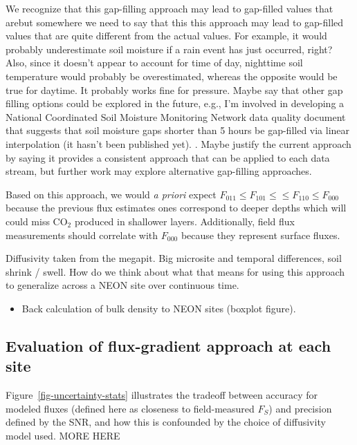 \documentclass[
  letterpaper,
  DIV=11,
  numbers=noendperiod]{scrartcl}
\providecommand{\tightlist}{%
  \setlength{\itemsep}{0pt}\setlength{\parskip}{0pt}}\usepackage{longtable,booktabs,array}
\begin{document}
We recognize that this gap-filling approach may lead to gap-filled
values that arebut somewhere we need to say that this this approach may
lead to gap-filled values that are quite different from the actual
values. For example, it would probably underestimate soil moisture if a
rain event has just occurred, right? Also, since it doesn't appear to
account for time of day, nighttime soil temperature would probably be
overestimated, whereas the opposite would be true for daytime. It
probably works fine for pressure. Maybe say that other gap filling
options could be explored in the future, e.g., I'm involved in
developing a National Coordinated Soil Moisture Monitoring Network data
quality document that suggests that soil moisture gaps shorter than 5
hours be gap-filled via linear interpolation (it hasn't been published
yet). . Maybe justify the current approach by saying it provides a
consistent approach that can be applied to each data stream, but further
work may explore alternative gap-filling approaches.

Based on this approach, we would \emph{a priori} expect
\(F_{011} \leq F_{101} \leq \leq F_{110} \leq F_{000}\) because the
previous flux estimates ones correspond to deeper depths which will
could miss CO\(_{2}\) produced in shallower layers. Additionally, field
flux measurements should correlate with \(F_{000}\) because they
represent surface fluxes.

Diffusivity taken from the megapit. Big microsite and temporal
differences, soil shrink / swell. How do we think about what that means
for using this approach to generalize across a NEON site over continuous
time.

\begin{itemize}
\tightlist
\item
  Back calculation of bulk density to NEON sites (boxplot figure).
\end{itemize}

\subsection{Evaluation of flux-gradient approach at each
site}\label{evaluation-of-flux-gradient-approach-at-each-site}

Figure~\ref{fig-uncertainty-stats} illustrates the tradeoff between
accuracy for modeled fluxes (defined here as closeness to field-measured
\(F_{S}\)) and precision defined by the SNR, and how this is confounded
by the choice of diffusivity model used. MORE HERE
\end{document}
